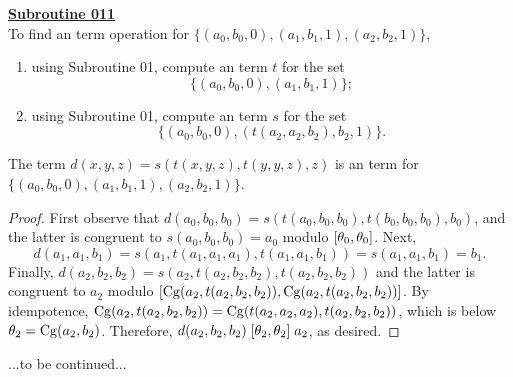 \noindent \underline{\textbf{Subroutine 011}}\\[4pt]
To find an \ld term operation for
$\{(a_0, b_0, 0), (a_1, b_1, 1),  (a_2, b_2, 1)\}$,
\begin{enumerate}
\item using Subroutine 01, compute an \ld term $t$ for the set
\begin{equation*}
\{(a_0, b_0, 0), (a_1, b_1, 1)\};
\end{equation*}
\item using Subroutine 01, compute an \ld term $s$  for the set
\begin{equation*}
\{(a_0, b_0, 0),  (t(a_2,a_2,b_2), b_2, 1)\}.
\end{equation*}
\end{enumerate}
 The term
$d(x,y,z) = s(t(x,y,z), t(y,y,z),z)$
is an \ld term  for
$\{(a_0, b_0, 0), (a_1, b_1, 1),  (a_2, b_2, 1)\}$.

\begin{proof}
First observe that
$d(a_0, b_0, b_0)=
s(t(a_0,b_0,b_0), t(b_0,b_0,b_0), b_0)$,
and the latter is congruent to $s(a_0, b_0, b_0) = a_0$ modulo
$[\theta_0, \theta_0]$. Next,
\[
d(a_1, a_1, b_1)
=s(a_1, t(a_1,a_1, a_1), t(a_1,a_1,b_1))
=s(a_1, a_1, b_1) = b_1.\]
Finally,
$d(a_2, b_2, b_2)=s(a_2, t(a_2,b_2,b_2), t(a_2,b_2,b_2))$
and the latter is congruent to $a_2$ modulo
$\mathrel{[\operatorname{Cg}(a_2, t(a_2,b_2,b_2)), \operatorname{Cg}(a_2, t(a_2,b_2,b_2))]}$.
By idempotence,
$\operatorname{Cg}(a_2, t(a_2,b_2,b_2)) =
\operatorname{Cg}(t(a_2,a_2,a_2), t(a_2,b_2,b_2))$, which is below
$\theta_2 = \operatorname{Cg}(a_2,b_2)$.  Therefore,
$d(a_2, b_2, b_2)\mathrel{[\theta_2, \theta_2]} a_2$, as desired.
\end{proof}

...to be continued...



























